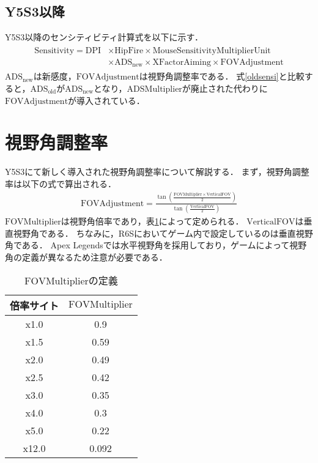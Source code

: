\documentclass[uplatex, dvipdfmx, ja=standard, a4paper]{bxjsarticle}
\begin{document}
\subsection{Y5S3以降}
Y5S3以降のセンシティビティ計算式を以下に示す．
\begin{align}
  \begin{split}
    \mathrm{Sensitivity} = \mathrm{DPI} &\times \mathrm{HipFire} \times \mathrm{MouseSensitivityMultiplierUnit} \\
    &\times \mathrm{ADS}_{\mathrm{new}} \times \mathrm{XFactorAiming} \times \mathrm{FOVAdjustment}
  \end{split}
  \label{newsensi}
\end{align}
\(\mathrm{ADS}_{\mathrm{new}}\)は新感度，\(\mathrm{FOVAdjustment}\)は視野角調整率である．
式\eqref{oldsensi}と比較すると，\(\mathrm{ADS}_{\mathrm{old}}\)が\(\mathrm{ADS}_{\mathrm{new}}\)となり，\(\mathrm{ADSMultiplier}\)が廃止された代わりに\(\mathrm{FOVAdjustment}\)が導入されている．

\section{視野角調整率}
Y5S3にて新しく導入された視野角調整率について解説する．
まず，視野角調整率は以下の式で算出される．
\begin{align}
  \mathrm{FOVAdjustment} = \frac{\tan \left(\frac{\mathrm{FOVMultiplier} \times \mathrm{VerticalFOV}}{2}\right)}{\tan \left(\frac{\mathrm{VerticalFOV}}{2}\right)}
  \label{fova}
\end{align}
\(\mathrm{FOVMultiplier}\)は視野角倍率であり，表\ref{fovmp}によって定められる．
\(\mathrm{VerticalFOV}\)は垂直視野角である．
ちなみに，R6Sにおいてゲーム内で設定しているのは垂直視野角である．
Apex Legendsでは水平視野角を採用しており，ゲームによって視野角の定義が異なるため注意が必要である．

\begin{table}[htbp]
  \centering
  \caption{\(\mathrm{FOVMultiplier}\)の定義}
  \label{fovmp}
  \begin{tabular}{c|c}
    倍率サイト & \(\mathrm{FOVMultiplier}\) \\ \hline
    x1.0 & 0.9 \\
    x1.5 & 0.59 \\
    x2.0 & 0.49 \\
    x2.5 & 0.42 \\
    x3.0 & 0.35 \\
    x4.0 & 0.3 \\
    x5.0 & 0.22 \\
    x12.0 & 0.092
  \end{tabular}
\end{table}
\end{document}
